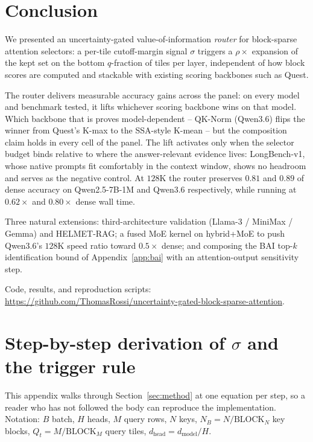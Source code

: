 \documentclass[11pt]{article}
\theoremstyle{remark}
\newcommand{\NB}{N_{\!B}}
\newcommand{\dhead}{d_{\text{head}}}
\newcommand{\BlockM}{\text{BLOCK}_M}
\newcommand{\BlockN}{\text{BLOCK}_N}
\begin{document}
\section*{Conclusion}
We presented an uncertainty-gated value-of-information \emph{router} for block-sparse attention selectors: a per-tile cutoff-margin signal $\sigma$ triggers a $\rho\times$ expansion of the kept set on the bottom $q$-fraction of tiles per layer, independent of how block scores are computed and stackable with existing scoring backbones such as Quest.

The router delivers measurable accuracy gains across the panel: on every model and benchmark tested, it lifts whichever scoring backbone wins on that model. Which backbone that is proves model-dependent -- QK-Norm (Qwen3.6) flips the winner from Quest's K-max to the SSA-style K-mean -- but the composition claim holds in every cell of the panel. The lift activates only when the selector budget binds relative to where the answer-relevant evidence lives: LongBench-v1, whose native prompts fit comfortably in the context window, shows no headroom and serves as the negative control. At $128$K the router preserves $0.81$ and $0.89$ of dense accuracy on Qwen2.5-7B-1M and Qwen3.6 respectively, while running at $0.62\times$ and $0.80\times$ dense wall time.

Three natural extensions: third-architecture validation (Llama-3 / MiniMax / Gemma) and HELMET-RAG; a fused MoE kernel on hybrid+MoE to push Qwen3.6's $128$K speed ratio toward $0.5\times$ dense; and composing the BAI top-$k$ identification bound of Appendix~\ref{app:bai} with an attention-output sensitivity step.

Code, results, and reproduction scripts:\\
\url{https://github.com/ThomasRossi/uncertainty-gated-block-sparse-attention}.

\clearpage
\appendix

\section{Step-by-step derivation of $\sigma$ and the trigger rule}\label{app:derivation}

This appendix walks through Section~\ref{sec:method} at one equation per step, so a reader who has not followed the body can reproduce the implementation. Notation: $B$ batch, $H$ heads, $M$ query rows, $N$ keys, $\NB = N / \BlockN$ key blocks, $Q_t = M / \BlockM$ query tiles, $\dhead = d_{\text{model}}/H$.
\end{document}
